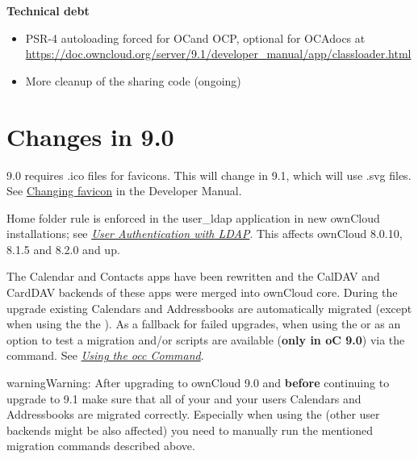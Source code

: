 \documentclass[letterpaper,10pt,english]{sphinxmanual}
\begin{document}
\textbf{Technical debt}
\begin{itemize}
\item {} 
PSR-4 autoloading forced for OCand OCP, optional for OCAdocs at \href{https://doc.owncloud.org/server/9.1/developer\_manual/app/classloader.html}{https://doc.owncloud.org/server/9.1/developer\_manual/app/classloader.html}

\item {} 
More cleanup of the sharing code (ongoing)

\end{itemize}


\section{Changes in 9.0}
\label{release_notes:release-notes-label}\label{release_notes:changes-in-9-0}
9.0 requires .ico files for favicons. This will change in 9.1, which will
use .svg files. See \href{https://doc.owncloud.org/server/9.0/developer\_manual/core/theming.html\#changing-favicon}{Changing favicon} in the Developer Manual.

Home folder rule is enforced in the user\_ldap application in new ownCloud installations; see
{\hyperref[configuration_user/user_auth_ldap::doc]{\emph{\emph{User Authentication with LDAP}}}}. This affects ownCloud 8.0.10, 8.1.5 and 8.2.0 and up.

The Calendar and Contacts apps have been rewritten and the CalDAV and CardDAV backends of these
apps were merged into ownCloud core. During the upgrade existing Calendars and Addressbooks
are automatically migrated (except when using the the ). As a fallback
for failed upgrades, when using the  or as an option to test a migration
 and/or  scripts are available
(\textbf{only in oC 9.0}) via the  command. See {\hyperref[configuration_server/occ_command::doc]{\emph{\emph{Using the occ Command}}}}.

\begin{notice}{warning}{Warning:}
After upgrading to ownCloud 9.0 and \textbf{before} continuing to upgrade to 9.1 make sure
that all of your and your users Calendars and Addressbooks are migrated correctly. Especially
when using the  (other user backends might be also affected) you need to
manually run the mentioned  migration commands described above.
\end{notice}
\end{document}
